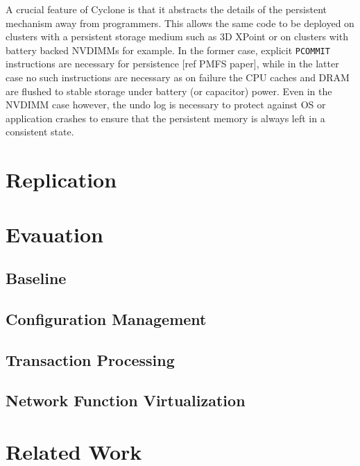\documentclass[twocolumn]{article}
\begin{document}
A crucial feature of Cyclone is that it abstracts the details of the persistent
mechanism away from programmers. This allows the same code to be deployed on
clusters with a persistent storage medium such as 3D XPoint or on clusters with
battery backed NVDIMMs for example. In the former case, explicit {\tt PCOMMIT}
instructions are necessary for persistence [ref PMFS paper], while in the latter
case no such instructions are necessary as on failure the CPU caches and DRAM
are flushed to stable storage under battery (or capacitor) power. Even in the
NVDIMM case however, the undo log is necessary to protect against OS or
application crashes to ensure that the persistent memory is always left in a
consistent state.


\section{Replication}

\section{Evauation}

\subsection{Baseline}

\subsection{Configuration Management}

\subsection{Transaction Processing}

\subsection{Network Function Virtualization}

\section{Related Work}
\end{document}
